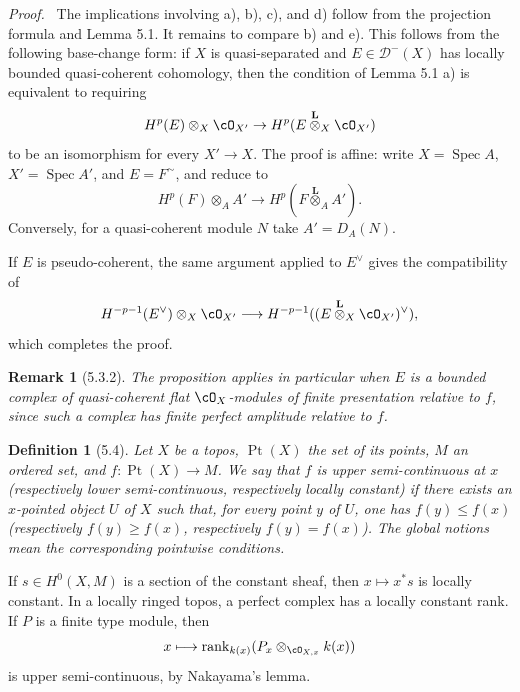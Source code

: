 \documentclass[11pt]{article}
\theoremstyle{plain}
\newtheorem*{definition*}{Definition}
\newtheorem*{remark*}{Remark}
\theoremstyle{definition}
\theoremstyle{remark}
\newenvironment{prooftext}{\par\noindent\textit{Proof.}\ }{\par\medskip}
\newcommand{\D}{\mathcal D}\newcommand{\E}{\mathcal E}\newcommand{\F}{\mathcal F}
\DeclareMathOperator{\Spec}{Spec}
\providecommand{\rg}{\operatorname{rank}}
\providecommand{\Ltens}{\overset{\mathbf L}{\otimes}}
\providecommand{\Pt}{\operatorname{Pt}}
\begin{document}
\begin{prooftext}
The implications involving a), b), c), and d) follow from the projection formula and Lemma 5.1. It remains to compare b) and e). This follows from the following base-change form: if $X$ is quasi-separated and $E\in\D^-(X)$ has locally bounded quasi-coherent cohomology, then the condition of Lemma 5.1 a) is equivalent to requiring
\[
H^p(E)\otimes_X\cO_{X'}\to H^p(E\Ltens_X\cO_{X'})
\]
to be an isomorphism for every $X'\to X$. The proof is affine: write $X=\Spec A$, $X'=\Spec A'$, and $E=F^{\sim}$, and reduce to
\[
H^p(F)\otimes_A A'\to H^p(F\Ltens_A A').
\]
Conversely, for a quasi-coherent module $N$ take $A'=D_A(N)$.

If $E$ is pseudo-coherent, the same argument applied to $E^\vee$ gives the compatibility of
\[
H^{-p-1}(E^\vee)\otimes_X\cO_{X'}
\longrightarrow
H^{-p-1}((E\Ltens_X\cO_{X'})^\vee),
\]
which completes the proof.
\end{prooftext}

\begin{remark*}[5.3.2]
The proposition applies in particular when $E$ is a bounded complex of quasi-coherent flat $\cO_X$-modules of finite presentation relative to $f$, since such a complex has finite perfect amplitude relative to $f$.
\end{remark*}

\begin{definition*}[5.4]
Let $X$ be a topos, $\Pt(X)$ the set of its points, $M$ an ordered set, and $f:\Pt(X)\to M$. We say that $f$ is upper semi-continuous at $x$ (respectively lower semi-continuous, respectively locally constant) if there exists an $x$-pointed object $U$ of $X$ such that, for every point $y$ of $U$, one has $f(y)\le f(x)$ (respectively $f(y)\ge f(x)$, respectively $f(y)=f(x)$). The global notions mean the corresponding pointwise conditions.
\end{definition*}

If $s\in H^0(X,M)$ is a section of the constant sheaf, then $x\mapsto x^*s$ is locally constant. In a locally ringed topos, a perfect complex has a locally constant rank. If $P$ is a finite type module, then
\[
x\longmapsto \rg_{k(x)}(P_x\otimes_{\cO_{X,x}}k(x))
\]
is upper semi-continuous, by Nakayama's lemma.
\end{document}
